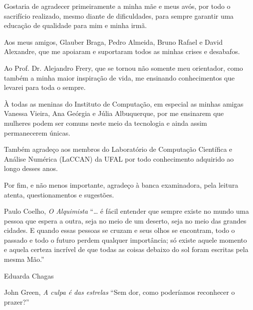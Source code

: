 \documentclass[tcc]{ic}
\begin{document}

\capa

\begin{agradecimentos}

Gostaria de agradecer primeiramente a minha mãe e meus avós, por todo o sacrifício realizado, mesmo diante de dificuldades, para sempre garantir uma educação de qualidade para mim e minha irmã.

Aos meus amigos, Glauber Braga, Pedro Almeida, Bruno Rafael e David Alexandre, que me apoiaram e suportaram todos as minhas crises e desabafos.

Ao Prof. Dr. Alejandro Frery, que se tornou não somente meu orientador, como também a minha maior inspiração de vida, me ensinando conhecimentos que levarei para toda o sempre.

À todas as meninas do Instituto de Computação, em especial as minhas amigas Vanessa Vieira, Ana Geórgia e Júlia Albuquerque, por me ensinarem que mulheres podem ser comuns neste meio da tecnologia e ainda assim permanecerem únicas.

Também agradeço aos membros do Laboratório de Computação Científica e Análise Numérica (LaCCAN) da UFAL por todo conhecimento adquirido ao longo desses anos.

Por fim, e não menos importante, agradeço à banca examinadora, pela leitura atenta, questionamentos e sugestões.


\vspace{2em}
\begin{epigraph}{Paulo Coelho, \textit{O Alquimista}}
``… é fácil entender que sempre existe no mundo uma pessoa que espera a outra, seja no meio de um deserto, seja no meio das grandes cidades. E quando essas pessoas se cruzam e seus olhos se encontram, todo o passado e todo o futuro perdem qualquer importância; só existe aquele momento e aquela certeza incrível de que todas as coisas debaixo do sol foram escritas pela mesma Mão.''
\end{epigraph}

 \vspace{2em}
 \begin{flushright}
 Eduarda Chagas
 \end{flushright}
\end{agradecimentos}

\newpage
\thispagestyle{empty}
\vspace*{\fill}
\begin{epigraph}{John Green, \textit{A culpa é das estrelas}}
``Sem dor, como poderíamos reconhecer o prazer?''
\end{epigraph}
\end{document}
